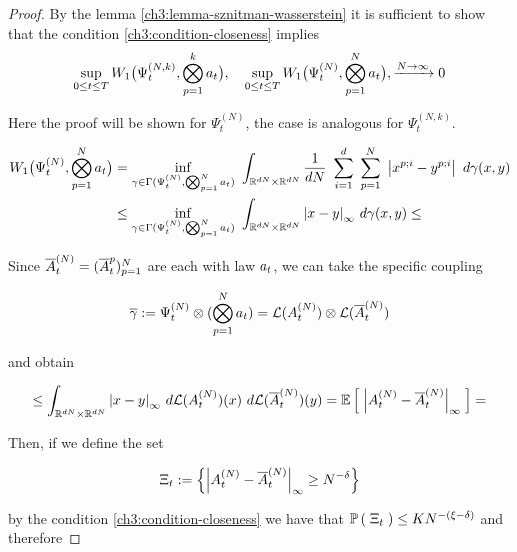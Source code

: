 \begin{proof}
	By the lemma \ref{ch3:lemma-sznitman-wasserstein}  it is sufficient to show that the condition \ref{ch3:condition-closeness} implies 
	\begin{equation*}
		\sup_{0\leq t\leq T}
		W_1 \big(
		\Psi_t^{(N,k)}, \bigotimes_{p=1}^{k} a_t
		\big),
		\quad
		\sup_{0\leq t\leq T}
		W_1 \big(
		\Psi_t^{(N)}, \bigotimes_{p=1}^{N}a_t
		\big),
		\xrightarrow {N \rightarrow \infty} 0
	\end{equation*}
	
	Here the proof will be shown for $\Psi_t^{(N)}$, the case is analogous for $\Psi_t^{(N,k)}$.
	
	\begin{align*}
		W_1 \big(
		\Psi_t^{(N)}, \bigotimes_{p=1}^{N}a_t
		\big) &=
		\inf_{\gamma \in \Gamma (\Psi_t^{(N)}, \bigotimes_{p=1}^{N}a_t)}\
		\int_{\mathbb{R}^{dN}\times \mathbb{R}^{dN}} \frac{1}{dN}\
		\sum_{i=1}^d\
		\sum_{p=1}^N\
		\left| x^{p;i} - y^{p;i} \right|\
		d\gamma(x,y)
		\\
		&\leq
		\inf_{\gamma \in \Gamma (\Psi_t^{(N)}, \bigotimes_{p=1}^{N}a_t)}\
		\int_{\mathbb{R}^{dN}\times \mathbb{R}^{dN}}
		{ \left| x-y \right|_{\infty} }\
		d\gamma(x,y)
		\leq
	\end{align*}
	
	Since $\overline{A}_t^{(N)} = (\overline{A}_t^p)_{p=1}^N$ are \iid each with law $a_t$, we can take the specific coupling 
	
	\begin{equation*}
		\overline{\gamma} := \Psi_t^{(N)} \otimes (\bigotimes_{p=1}^{N}a_t) = \mathcal{L}(A_t^{(N)}) \otimes \mathcal{L}(\overline{A}_t^{(N)})
	\end{equation*}
	
	and obtain
	
	\begin{equation*}
		\leq
		\int_{\mathbb{R}^{dN}\times \mathbb{R}^{dN}}
			{ \left| x-y \right|_{\infty} }\
		d \mathcal{L}(A_t^{(N)}) (x)\
		d \mathcal{L}(\overline{A}_t^{(N)}) (y)
		=
		\mathbb{E} \left[ \; 
			{ \left| 
				A_t^{(N)} - \overline{A}_t^{(N)}
			 \right|_{\infty} }
		 \; \right]
		=
	\end{equation*}
	
	Then, if we define the set
	
	\begin{equation*}
		\Xi_t := \left\{
		{ \left| 
			A_t^{(N)} - \overline{A}_t^{(N)}
		 \right|_{\infty} } \geq N^{-\delta}
		\right\}
	\end{equation*}
	
	by the condition \ref{ch3:condition-closeness} we have that $\mathbb{P} \left( \; \Xi_t \; \right) \leq K	N^{-(\xi-\delta)}$ and therefore
	

\end{proof}
